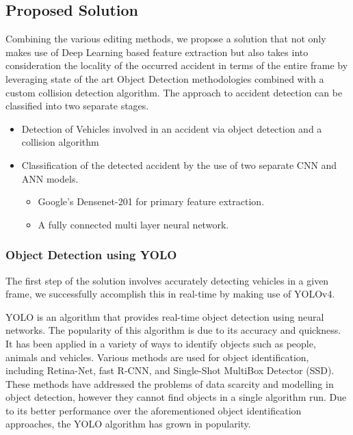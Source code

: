 \documentclass[ 12pt,a4paper,twocolumn,fleqn]{article}
\begin{document}
\begin{adjustwidth}{3.5em}{0pt}
\newpage
 \pagestyle{fancy}
 
\subsection{Proposed Solution}

Combining the various editing methods, we propose a solution that not only makes use of Deep Learning based feature extraction but also takes into consideration the locality of the occurred accident in terms of the entire frame by leveraging state of the art Object Detection methodologies combined with a custom collision detection algorithm.
The approach to accident detection can be classified into two separate stages.
\begin{itemize}
   \item { Detection of Vehicles involved in an accident via object detection and a collision algorithm }
   \item {Classification of the detected accident by the use of two separate CNN and ANN models. }
   \begin{itemize}
       \item Google’s Densenet-201 for primary feature extraction.
       \item A fully connected multi layer neural network.
   \end{itemize}
\end{itemize}


\hspace{0.2cm}



\subsubsection{Object Detection using YOLO}

The first step of the solution involves accurately detecting vehicles in a given frame, we successfully accomplish this in real-time by making use of YOLOv4.

YOLO is an algorithm that provides real-time object detection using neural networks.
The popularity of this algorithm is due to its accuracy and quickness.
It has been applied in a variety of ways to identify objects such as people, animals and vehicles.
Various methods are used for object identification, including Retina-Net, fast R-CNN, and Single-Shot MultiBox Detector (SSD).
These methods have addressed the problems of data scarcity and modelling in object detection, however they cannot find objects in a single algorithm run. Due to its better performance over the aforementioned object identification approaches, the YOLO algorithm has grown in popularity.



\end{adjustwidth}
\end{document}
